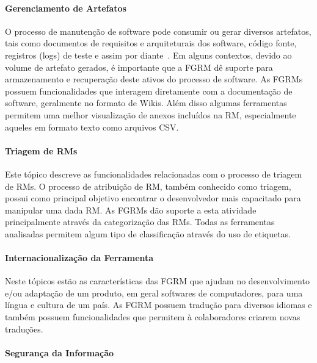 \paragraph{Gerenciamento de Artefatos}
\label{par:gerenciamento_de_artefatos}

O processo de manutenção de software pode consumir ou gerar diversos artefatos,
tais como documentos de requisitos e arquiteturais dos software, código fonte,
registros (logs) de teste e assim por diante~\cite{cavalcanti2013bug}. Em alguns
contextos, devido ao volume de artefato gerados, é importante que a FGRM dê
suporte para armazenamento e recuperação deste ativos do processo de software.
As FGRMs possuem funcionalidades que interagem diretamente com a documentação
de software, geralmente no formato de Wikis. Além disso algumas ferramentas
permitem uma melhor visualização de anexos incluídos na RM, especialmente
aqueles em formato texto como arquivos CSV\@.

\paragraph{Triagem de RMs}
\label{par:triagem_de_rm_s}

Este tópico descreve as funcionalidades relacionadas com o processo de triagem
de RMs. O processo de atribuição de RM, também conhecido como triagem, possui
como principal objetivo encontrar o desenvolvedor mais capacitado para manipular
uma dada RM\@. As FGRMs dão suporte a esta atividade principalmente através da
categorização das RMs. Todas as ferramentas analisadas permitem algum tipo de
classificação através do uso de etiquetas.

\paragraph{Internacionalização da Ferramenta}
\label{par:internacionalização_da_ferramenta}

Neste tópicos estão as características das FGRM que ajudam no desenvolvimento
e/ou adaptação de um produto, em geral softwares de computadores, para uma
língua e cultura de um país. As FGRM possuem tradução para diversos idiomas e
também possuem funcionalidades que permitem à colaboradores criarem novas
traduções.

\paragraph{Segurança da Informação}
\label{par:segurança_da_informação}


